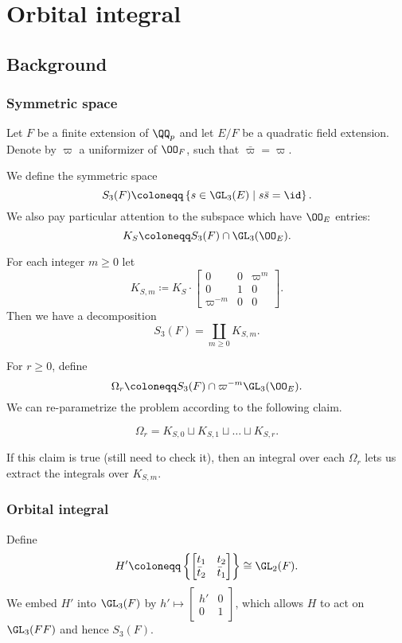 \chapter{Orbital integral}
\section{Background}
\subsection{Symmetric space}
Let $F$ be a finite extension of $\QQ_p$ and
let $E/F$ be a quadratic field extension.
Denote by $\varpi$ a uniformizer of $\OO_F$, such that $\bar \varpi = \varpi$.

We define the symmetric space
\[ S_3(F) \coloneqq \left\{ s \in \GL_3(E) \mid s \bar s = \id \right\}. \]
We also pay particular attention to the subspace which have $\OO_E$ entries:
\[ K_S \coloneqq S_3(F) \cap \GL_3(\OO_E). \]
\begin{lemma}
  For each integer $m \ge 0$ let
  \[ K_{S,m} \coloneqq K_S \cdot \begin{bmatrix} 0 & 0 & \varpi^m \\ 0 & 1 & 0 \\ \varpi^{-m} & 0 & 0 \end{bmatrix}. \]
  Then we have a decomposition
  \[ S_3(F) = \coprod_{m \geq 0} K_{S,m}. \]
\end{lemma}
For $r \geq 0$, define
\[ \Omega_r \coloneqq S_3(F) \cap \varpi^{-m} \GL_3(\OO_E). \]
We can re-parametrize the problem according to the following claim.
\begin{claim}
  \[ \Omega_r = K_{S,0} \sqcup K_{S,1} \sqcup \dots \sqcup K_{S,r}. \]
\end{claim}
If this claim is true (still need to check it),
then an integral over each $\Omega_r$ lets us extract the integrals over $K_{S,m}$.

\subsection{Orbital integral}
Define
\[ H' \coloneqq
  \left\{ \begin{bmatrix} t_1 & t_2 \\ \bar t_2 & \bar t_1 \end{bmatrix} \right\}
  \cong \GL_2(F). \]
We embed $H'$ into $\GL_3(F)$ by
$h' \mapsto \left[ \begin{smallmatrix} h' & 0 \\ 0 &1 \end{smallmatrix} \right]$,
which allows $H$ to act on $\GL_3(FF)$ and hence $S_3(F)$.


